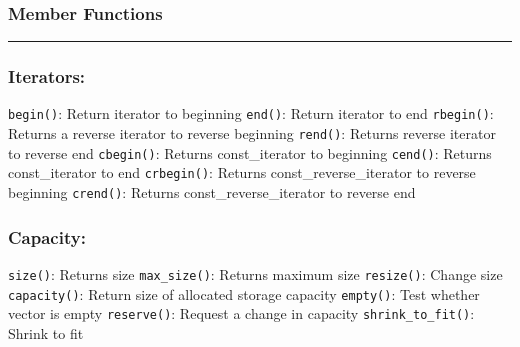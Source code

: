 \documentclass{report}
\begin{document}
\subsubsection{Member Functions}
\hrule \vspace{3mm}
\begin{minipage}{0.5\textwidth}
\subsubsection*{Iterators:}
\texttt{begin()}:  Return iterator to beginning
\bigbreak \noindent
\texttt{end()}: Return iterator to end
\bigbreak \noindent 
\texttt{rbegin()}: Returns a reverse iterator to reverse beginning
\bigbreak \noindent
\texttt{rend()}: Returns reverse iterator to reverse end
\bigbreak \noindent
\texttt{cbegin()}: Returns const\_iterator to beginning
\bigbreak \noindent
\texttt{cend()}: Returns const\_iterator to end
\bigbreak \noindent
\texttt{crbegin()}: Returns const\_reverse\_iterator to reverse beginning
\bigbreak \noindent
\texttt{crend()}: Returns const\_reverse\_iterator to reverse end
\bigbreak \noindent
\subsubsection*{Capacity:} 
\texttt{size()}: Returns size
\bigbreak\noindent
\texttt{max\_size()}: Returns maximum size
\bigbreak\noindent
\texttt{resize()}: Change size
\bigbreak\noindent
\texttt{capacity()}: Return size of allocated storage capacity
\bigbreak\noindent
\texttt{empty()}: Test whether vector is empty
\bigbreak\noindent
\texttt{reserve()}: Request a change in capacity
\bigbreak\noindent
\texttt{shrink\_to\_fit()}: Shrink to fit
\bigbreak\noindent
\end{minipage}
\end{document}
